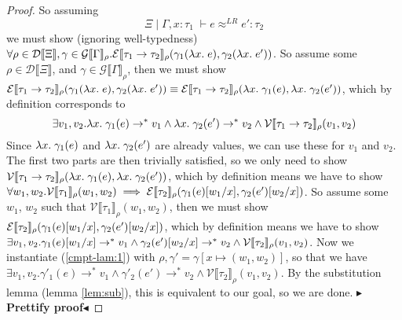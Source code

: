 \documentclass[twoside,11pt,openright]{report}
\theoremstyle{definition}
\newcommand{\var}{x}
\newcommand{\expr}{e}
\newcommand{\val}{v}
\newcommand{\valB}{w}
\newcommand{\subst}[3]{#1{\left[#3 \middle/ #2 \right]}}
\newcommand{\Tfunc}[2]{#1 \rightarrow #2}
\newcommand{\typ}{\tau}
\newcommand{\venv}{\Gamma}
\newcommand{\tenv}{\Xi}
\newcommand{\jdgRel}[6]{#1 \; | \; #2 \; \vdash #3 \approx^{#4} #5 : #6}
\newcommand{\stepS}{\rightarrow^*}
\newcommand{\ValInp}[2]{\mathcal{V} \llbracket #1 \rrbracket_{#2}}
\newcommand{\ExpInp}[2]{\mathcal{E} \llbracket #1 \rrbracket_{#2}}
\newcommand{\VenvInp}[2]{\mathcal{G} \llbracket #1 \rrbracket_{#2}}
\newcommand{\TenvInp}[1]{\mathcal{D} \llbracket #1 \rrbracket}
\newcommand{\LogRel}[5]{\jdgRel{#1}{#2}{#3}{LR}{#4}{#5}}
\newcommand{\map}[2]{#1 \mapsto #2}
\newcommand{\todo}[1]{{\color[rgb]{.5,0,0}\textbf{$\blacktriangleright$#1$\blacktriangleleft$}}}
\begin{document}
\begin{proof}
  So assuming 
  \begin{equation}\label{cmpt-lam:1}
    \LogRel{\tenv}{\venv, x : \typ_1}{\expr}{\expr'}{\typ_2}
  \end{equation}
  we must show (ignoring well-typedness) $\forall \rho \in \TenvInp{\tenv}, \gamma \in \VenvInp{\venv}{\rho} . \ExpInp{\Tfunc{\typ_1}{\typ_2}}{\rho}(\gamma_1(\fun \var . \expr), \gamma_2(\fun \var . \expr'))$. So assume some $\rho \in \TenvInp{\tenv}$, and $\gamma \in \VenvInp{\venv}{\rho}$, then we must show $\ExpInp{\Tfunc{\typ_1}{\typ_2}}{\rho}(\gamma_1(\fun \var . \expr), \gamma_2(\fun \var . \expr')) \equiv \ExpInp{\Tfunc{\typ_1}{\typ_2}}{\rho}(\fun \var . \gamma_1(\expr), \fun \var . \gamma_2(\expr'))$, which by definition corresponds to
  \begin{equation}\label{cmpt-lam:goal}
    \exists \val_1, \val_2 . \fun \var . \gamma_1(\expr) \stepS \val_1 \land \fun \var . \gamma_2(\expr') \stepS \val_2 \land \ValInp{\Tfunc{\typ_1}{\typ_2}}{\rho}(\val_1, \val_2)
  \end{equation}
  Since $\fun \var . \gamma_1(\expr)$ and $\fun \var . \gamma_2(\expr')$ are already values, we can use these for $\val_1$ and $\val_2$. The first two parts are then trivially satisfied, so we only need to show $\ValInp{\Tfunc{\typ_1}{\typ_2}}{\rho}(\fun \var . \gamma_1(\expr), \fun \var . \gamma_2(\expr'))$, which by definition means we have to show $\forall \valB_1, \valB_2 . \ValInp{\typ_1}{\rho}(\valB_{1}, \valB_{2}) \implies
  \ExpInp{\typ_2}{\rho}(\subst{\gamma_1(\expr)}{\var}{\valB_1}, \subst{\gamma_2(\expr')}{\var}{\valB_2})$. So assume some $\valB_1$, $\valB_2$ such that $\ValInp{\typ_1}{\rho}(\valB_{1}, \valB_{2})$, then we must show $\ExpInp{\typ_2}{\rho}(\subst{\gamma_1(\expr)}{\var}{\valB_1}, \subst{\gamma_2(\expr')}{\var}{\valB_2})$, which by definition means we have to show 
  $\exists \val_1, \val_2 . \subst{\gamma_1(\expr)}{\var}{\valB_1} \stepS \val_1 \land \subst{\gamma_2(\expr')}{\var}{\valB_2} \stepS \val_2 \land \ValInp{\typ_2}{\rho}(\val_1, \val_2)$. Now we instantiate (\ref*{cmpt-lam:1}) with $\rho, \gamma' = \gamma[\map{\var}{(\valB_1, \valB_2)}]$, so that we have
  $\exists \val_1, \val_2 . \gamma'_1(\expr) \stepS \val_1 \land \gamma'_2(\expr') \stepS \val_2 \land \ValInp{\typ_2}{\rho}(\val_1, \val_2)$. By the substitution lemma (lemma \ref*{lem:sub}), this is equivalent to our goal, so we are done.
  \todo{Prettify proof}
\end{proof}
\end{document}
